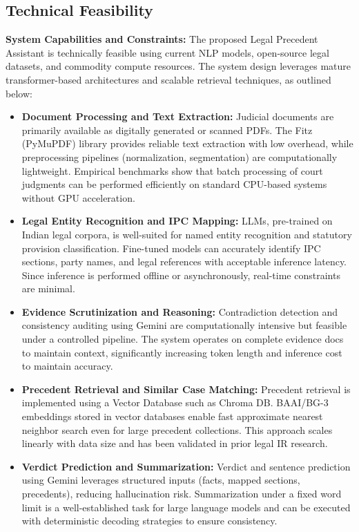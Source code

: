 \subsection{Technical Feasibility}
\textbf{System Capabilities and Constraints:}
The proposed Legal Precedent Assistant is technically feasible using current NLP models, open-source legal datasets, and commodity compute resources. The system design leverages mature transformer-based architectures and scalable retrieval techniques, as outlined below:

\begin{itemize}
	\item \textbf{Document Processing and Text Extraction:} 
	Judicial documents are primarily available as digitally generated or scanned PDFs. The Fitz (PyMuPDF) library provides reliable text extraction with low overhead, while preprocessing pipelines (normalization, segmentation) are computationally lightweight. Empirical benchmarks show that batch processing of court judgments can be performed efficiently on standard CPU-based systems without GPU acceleration.
	
	\item \textbf{Legal Entity Recognition and IPC Mapping:}
	LLMs, pre-trained on Indian legal corpora, is well-suited for named entity recognition and statutory provision classification. Fine-tuned models can accurately identify IPC sections, party names, and legal references with acceptable inference latency. Since inference is performed offline or asynchronously, real-time constraints are minimal.
	
	\item \textbf{Evidence Scrutinization and Reasoning:}
	Contradiction detection and consistency auditing using Gemini are computationally intensive but feasible under a controlled pipeline. The system operates on complete evidence docs to maintain context, significantly increasing token length and inference cost to maintain accuracy.
	
	\item \textbf{Precedent Retrieval and Similar Case Matching:}
	Precedent retrieval is implemented using a Vector Database such as Chroma DB. BAAI/BG-3 embeddings stored in vector databases enable fast approximate nearest neighbor search even for large precedent collections. This approach scales linearly with data size and has been validated in prior legal IR research.
	
	\item \textbf{Verdict Prediction and Summarization:}
	Verdict and sentence prediction using Gemini leverages structured inputs (facts, mapped sections, precedents), reducing hallucination risk. Summarization under a fixed word limit is a well-established task for large language models and can be executed with deterministic decoding strategies to ensure consistency.
	

\end{itemize}

